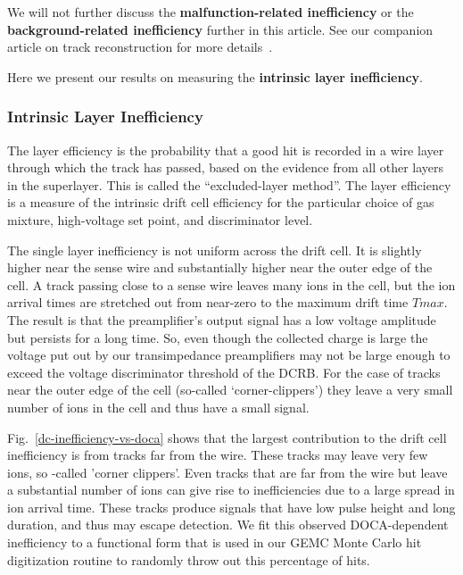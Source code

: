We will not further discuss the {\bf malfunction-related inefficiency} or
the {\bf background-related inefficiency} further in this article.  See
our companion article on track reconstruction for more details~\cite{recon-nim}.

Here we present our results on measuring the {\bf intrinsic layer inefficiency}.

\subsubsection{Intrinsic Layer Inefficiency}

The layer efficiency is the probability that a
good hit is recorded in a wire layer through which the track has passed, based on 
the evidence from all other layers in the superlayer.  This is called the 
``excluded-layer method''.  The layer efficiency is a measure of the intrinsic drift 
cell efficiency for the particular choice of gas mixture, high-voltage set point, and 
discriminator level.  

The single layer inefficiency is not uniform across the drift cell.  It is slightly higher near the sense 
wire and substantially higher near the outer edge of the cell.  A track passing close to a sense wire 
leaves many ions in the cell, but the
ion arrival times are stretched out from near-zero to the maximum drift time $Tmax$.  The result is that
the preamplifier's output signal has a low voltage amplitude but persists for a long time.  So, even though
the collected charge is large the voltage put out by our transimpedance preamplifiers may not be large
enough to exceed the voltage discriminator threshold of the DCRB. For the case of tracks near the outer
edge of the cell (so-called `corner-clippers') they leave a very small number of ions in the cell and
thus have a small signal.

Fig.~\ref{dc-inefficiency-vs-doca} shows that the largest contribution to the drift cell
inefficiency is from tracks far from the wire.  These tracks may leave very few ions,
so -called 'corner clippers'.  Even tracks that are far from the wire but leave a substantial
number of ions can give rise to inefficiencies due to a large spread in ion arrival time.  
These tracks produce signals 
that have low pulse height and long duration, and thus may escape detection.
We fit this observed DOCA-dependent inefficiency to a functional form that is
used in our GEMC Monte Carlo hit digitization routine to randomly throw out
this percentage of hits.

